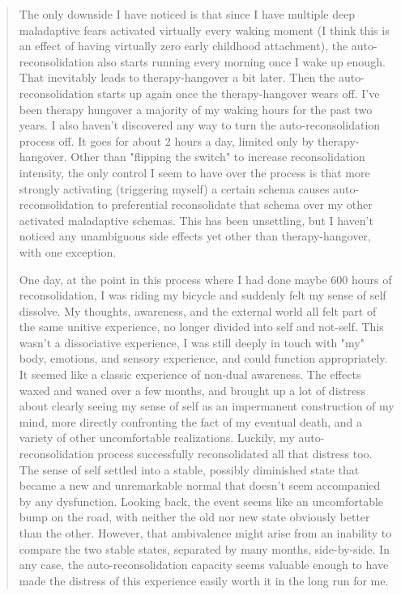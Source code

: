 \documentclass[12pt,letterpaper]{book}
\begin{document}
\begin{quotation}
    The only downside I have noticed is that since I have multiple deep maladaptive fears activated virtually every waking moment (I think this is an effect of having virtually zero early childhood attachment), the auto-reconsolidation also starts running every morning once I wake up enough. That inevitably leads to therapy-hangover a bit later. Then the auto-reconsolidation starts up again once the therapy-hangover wears off. I've been therapy hungover a majority of my waking hours for the past two years. I also haven't discovered any way to turn the auto-reconsolidation process off. It goes for about 2 hours a day, limited only by therapy-hangover. Other than "flipping the switch" to increase reconsolidation intensity, the only control I seem to have over the process is that more strongly activating (triggering myself) a certain schema causes auto-reconsolidation to preferential reconsolidate that schema over my other activated maladaptive schemas. This has been unsettling, but I haven't noticed any unambiguous side effects yet other than therapy-hangover, with one exception.

    One day, at the point in this process where I had done maybe 600 hours of reconsolidation, I was riding my bicycle and suddenly felt my sense of self dissolve. My thoughts, awareness, and the external world all felt part of the same unitive experience, no longer divided into self and not-self. This wasn't a dissociative experience, I was still deeply in touch with "my" body, emotions, and sensory experience, and could function appropriately. It seemed like a classic experience of non-dual awareness. The effects waxed and waned over a few months, and brought up a lot of distress about clearly seeing my sense of self as an impermanent construction of my mind, more directly confronting the fact of my eventual death, and a variety of other uncomfortable realizations. Luckily, my auto-reconsolidation process successfully reconsolidated all that distress too. The sense of self settled into a stable, possibly diminished state that became a new and unremarkable normal that doesn't seem accompanied by any dysfunction. Looking back, the event seems like an uncomfortable bump on the road, with neither the old nor new state obviously better than the other. However, that ambivalence might arise from an inability to compare the two stable states, separated by many months, side-by-side. In any case, the auto-reconsolidation capacity seems valuable enough to have made the distress of this experience easily worth it in the long run for me.


\end{quotation}
\end{document}
